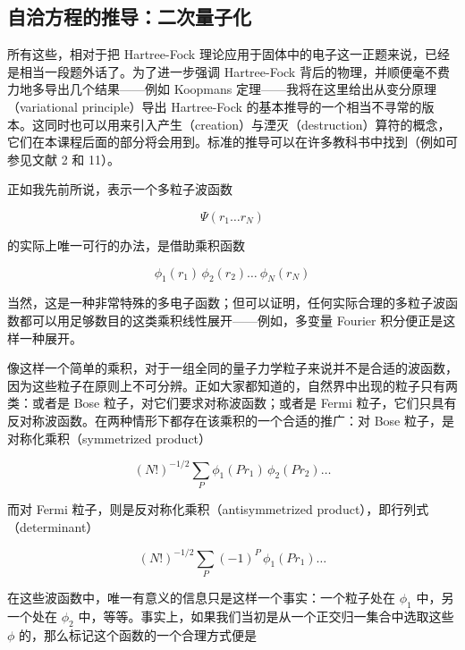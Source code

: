 \subsection{自洽方程的推导：二次量子化}

所有这些，相对于把 Hartree-Fock 理论应用于固体中的电子这一正题来说，已经是相当一段题外话了。为了进一步强调 Hartree-Fock 背后的物理，并顺便毫不费力地多导出几个结果——例如 Koopmans 定理——我将在这里给出从变分原理（variational principle）导出 Hartree-Fock 的基本推导的一个相当不寻常的版本。这同时也可以用来引入产生（creation）与湮灭（destruction）算符的概念，它们在本课程后面的部分将会用到。标准的推导可以在许多教科书中找到（例如可参见文献 2 和 11）。

正如我先前所说，表示一个多粒子波函数

\begin{equation*}
\Psi(r_1\ldots r_N)
\end{equation*}

的实际上唯一可行的办法，是借助乘积函数

\begin{equation*}
\phi_1(r_1)\,\phi_2(r_2)\ldots\ \phi_N(r_N)
\end{equation*}

当然，这是一种非常特殊的多电子函数；但可以证明，任何实际合理的多粒子波函数都可以用足够数目的这类乘积线性展开——例如，多变量 Fourier 积分便正是这样一种展开。

像这样一个简单的乘积，对于一组全同的量子力学粒子来说并不是合适的波函数，因为这些粒子在原则上不可分辨。正如大家都知道的，自然界中出现的粒子只有两类：或者是 Bose 粒子，对它们要求对称波函数；或者是 Fermi 粒子，它们只具有反对称波函数。在两种情形下都存在该乘积的一个合适的推广：对 Bose 粒子，是对称化乘积（symmetrized product）

\begin{equation*}
(N!)^{-1/2}\sum_P \phi_1(Pr_1)\,\phi_2(Pr_2)\ldots
\end{equation*}

而对 Fermi 粒子，则是反对称化乘积（antisymmetrized product），即行列式（determinant）

\begin{equation*}
(N!)^{-1/2}\sum_P (-1)^P\,\phi_1(Pr_1)\ldots
\end{equation*}

在这些波函数中，唯一有意义的信息只是这样一个事实：一个粒子处在 $\phi_1$ 中，另一个处在 $\phi_2$ 中，等等。事实上，如果我们当初是从一个正交归一集合中选取这些 $\phi$ 的，那么标记这个函数的一个合理方式便是

